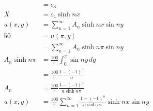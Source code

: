 \documentclass{article}
\begin{document}
\begin{align*}
                    & = c_3                                                                                     \\
  X                 & = c_4 \sinh n x                                                                           \\
  u(x, y)           & = \sum_{n = 1}^\infty A_n \sinh n x \sin n y                                              \\
  50                & = u(\pi, y)                                                                               \\
                    & = \sum_{n = 1}^\infty A_n \sinh n \pi \sin n y                                            \\
  A_n \sinh n \pi   & = \frac{100}{\pi} \int_0^\pi \sin n y \,d y                                               \\
                    & = \frac{100}{\pi} \frac{1 - (-1)^n}{n}                                                    \\
  A_n               & = \frac{100}{\pi} \frac{1 - (-1)^n}{n \sinh n \pi}                                        \\
  u(x, y)           & = \frac{100}{\pi} \sum_{n = 1}^\infty \frac{1 - (-1)^n}{n \sinh n \pi} \sinh n x \sin n y
\end{align*}
\end{document}
